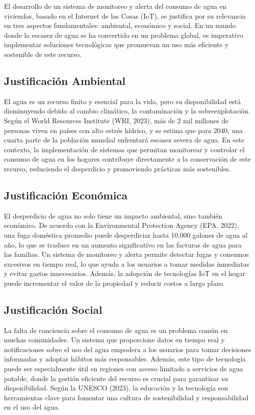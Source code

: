 \documentclass[conference]{IEEEtran}
\begin{document}
El desarrollo de un sistema de monitoreo y alerta del consumo de agua en
viviendas, basado en el Internet de las Cosas (IoT), se justifica por su
relevancia en tres aspectos fundamentales: ambiental, económico y social. En un
mundo donde la escasez de agua se ha convertido en un problema global, es
imperativo implementar soluciones tecnológicas que promuevan un uso más
eficiente y sostenible de este recurso.

\subsection{Justificación Ambiental }

El agua es un recurso finito y esencial para la vida, pero su disponibilidad
está disminuyendo debido al cambio climático, la contaminación y la
sobreexplotación. Según el World Resources Institute (WRI, 2023), más de 2 mil
millones de personas viven en países con alto estrés hídrico, y se estima que
para 2040, una cuarta parte de la población mundial enfrentará escasez severa
de agua. En este contexto, la implementación de sistemas que permitan
monitorear y controlar el consumo de agua en los hogares contribuye
directamente a la conservación de este recurso, reduciendo el desperdicio y
promoviendo prácticas más sostenibles.

\subsection{Justificación Económica }

El desperdicio de agua no solo tiene un impacto ambiental, sino también
económico. De acuerdo con la Environmental Protection Agency (EPA, 2022), una
fuga doméstica promedio puede desperdiciar hasta 10,000 galones de agua al año,
lo que se traduce en un aumento significativo en las facturas de agua para las
familias. Un sistema de monitoreo y alerta permite detectar fugas y consumos
excesivos en tiempo real, lo que ayuda a los usuarios a tomar medidas
inmediatas y evitar gastos innecesarios. Además, la adopción de tecnologías IoT
en el hogar puede incrementar el valor de la propiedad y reducir costos a largo
plazo.

\subsection{Justificación Social }

La falta de conciencia sobre el consumo de agua es un problema común en muchas
comunidades. Un sistema que proporcione datos en tiempo real y notificaciones
sobre el uso del agua empodera a los usuarios para tomar decisiones informadas
y adoptar hábitos más responsables. Además, este tipo de tecnología puede ser
especialmente útil en regiones con acceso limitado a servicios de agua potable,
donde la gestión eficiente del recurso es crucial para garantizar su
disponibilidad. Según la UNESCO (2023), la educación y la tecnología son
herramientas clave para fomentar una cultura de sostenibilidad y
responsabilidad en el uso del agua.
\end{document}
